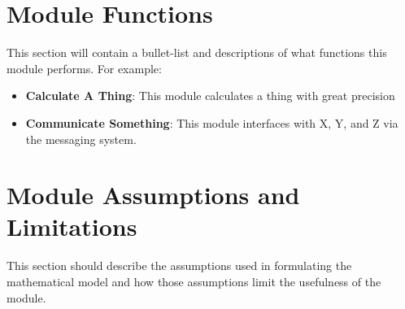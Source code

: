 

\section{Module Functions}
This section will contain a bullet-list and descriptions of what functions this module performs. For example:
\begin{itemize}
	\item \textbf{Calculate A Thing}: This module calculates a thing with great precision
	\item \textbf{Communicate Something}: This module interfaces with X, Y, and Z via the messaging system.
\end{itemize}

\section{Module Assumptions and Limitations}
This section should describe the assumptions used in formulating the mathematical model and how those assumptions limit the usefulness of the module.